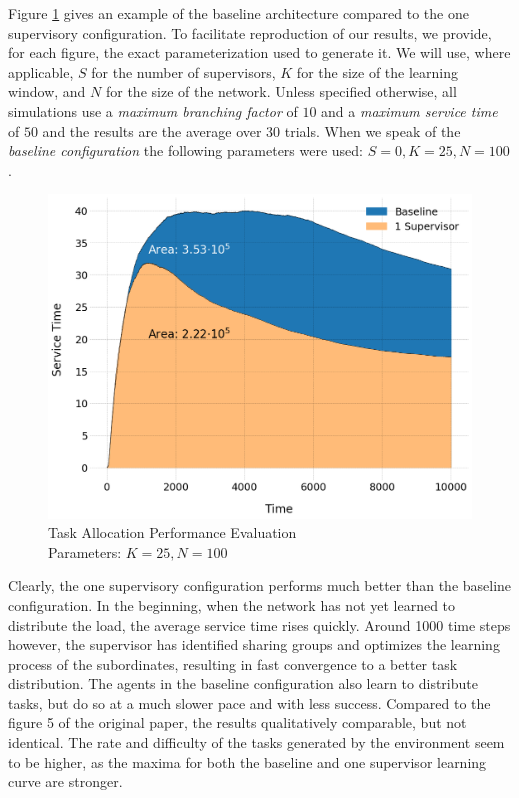 \documentclass[letterpaper]{article}
\begin{document}
Figure \ref{fig:areas} gives an example of the baseline architecture compared to the one supervisory configuration. To facilitate reproduction of our results, we provide, for each figure, the exact parameterization used to generate it. We will use, where applicable, $S$ for the number of supervisors, $K$ for the size of the learning window, and $N$ for the size of the network. Unless specified otherwise, all simulations use a \textit{maximum branching factor} of $10$ and a \textit{maximum service time} of $50$ and the results are the average over 30 trials. When we speak of the \textit{baseline configuration} the following parameters were used: $S=0,K=25,N=100$.
\begin{figure}[H]
 \begin{center}
  \includegraphics[width=\linewidth]{figures/figure5_light}
  \caption{Task Allocation Performance Evaluation\\Parameters: $K=25,N=100$}
  \label{fig:areas}
 \end{center}
\end{figure}

Clearly, the one supervisory configuration performs much better than the baseline configuration. In the beginning, when the network has not yet learned to distribute the load, the average service time rises quickly. Around 1000 time steps however, the supervisor has identified sharing groups and optimizes the learning process of the subordinates, resulting in fast convergence to a better task distribution. The agents in the baseline configuration also learn to distribute tasks, but do so at a much slower pace and with less success. Compared to the figure 5 of the original paper, the results qualitatively comparable, but not identical. The rate and difficulty of the tasks generated by the environment seem to be higher, as the maxima for both the baseline and one supervisor learning curve are stronger. 
\end{document}
